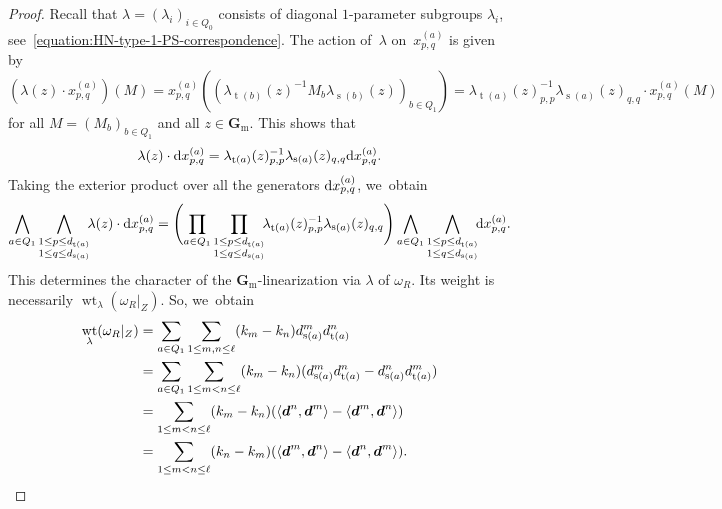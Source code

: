 \documentclass[11pt]{article}
\theoremstyle{plain}
\theoremstyle{definition}
\DeclareMathOperator\source{s}
\DeclareMathOperator\target{t}
\DeclareMathOperator\weight{wt}
\newcommand\diff{\mathrm{d} \kern 0pt}
\newcommand\Gm{\ensuremath{\mathbf{G}_{\mathrm{m}}}}
\newcommand\tuple[1]{\ensuremath{{\boldsymbol{#1}}}}
\begin{document}
\begin{proof}
Recall that $\lambda = (\lambda_i)_{i \in Q_0}$ consists of diagonal $1$-parameter subgroups $\lambda_i$,
see~\eqref{equation:HN-type-1-PS-correspondence}.
The action of~$\lambda$ on~$x_{p,q}^{(a)}$ is given by
\begin{equation*}
(\lambda(z) \cdot x_{p,q}^{(a)})(M) = x_{p,q}^{(a)}((\lambda_{\target(b)}(z)^{-1}M_b\lambda_{\source(b)}(z))_{b \in Q_1})
= \lambda_{\target(a)}(z)_{p,p}^{-1}\lambda_{\source(a)}(z)_{q,q}\cdot x_{p,q}^{(a)}(M)
\end{equation*}
for all $M = (M_b)_{b \in Q_1}$ and all $z \in \Gm$.
This shows that
\begin{equation*}
\lambda(z)\cdot \diff x_{p,q}^{(a)} = \lambda_{\target(a)}(z)_{p,p}^{-1}\lambda_{\source(a)}(z)_{q,q} \diff x_{p,q}^{(a)}.
\end{equation*}
Taking the exterior product over all the generators $\diff x_{p,q}^{(a)}$, we~obtain
\begin{equation*}
\bigwedge_{a \in Q_1}\bigwedge_{\substack{1 \leq p \leq d_{\target(a)} \\ 1 \leq q \leq d_{\source(a)}}} \!\! \lambda(z)\cdot \diff x_{p,q}^{(a)}
= \Biggl( \prod_{a \in Q_1} \prod_{\substack{1 \leq p \leq d_{\target(a)} \\ 1 \leq q \leq d_{\source(a)}}} \!\! \lambda_{\target(a)}(z)_{p,p}^{-1}\lambda_{\source(a)}(z)_{q,q} \Biggr) \bigwedge_{a \in Q_1} \bigwedge_{\substack{1 \leq p \leq d_{\target(a)} \\ 1 \leq q \leq d_{\source(a)}}} \!\!\diff x_{p,q}^{(a)}.
\end{equation*}
This determines the character of the $\Gm$-linearization via $\lambda$ of $\omega_R$.
Its weight is necessarily $\weight_\lambda(\omega_R|_Z)$. So, we~obtain
\begin{align*}
\weight_\lambda(\omega_R|_Z)
&= \sum_{a \in Q_1} \sum_{1 \leq m,n \leq \ell} (k_m - k_n) d_{\source(a)}^m d_{\target(a)}^n \\
&= \sum_{a \in Q_1} \sum_{1 \leq m < n \leq \ell}(k_m - k_n)(d_{\source(a)}^m d_{\target(a)}^n - d_{\source(a)}^n d_{\target(a)}^m) \\
&= \sum_{1 \leq m < n \leq \ell}(k_m - k_n)(\langle \tuple{d}^n,\tuple{d}^m \rangle - \langle \tuple{d}^m,\tuple{d}^n \rangle) \\
&= \sum_{1 \leq m < n \leq \ell}(k_n - k_m)(\langle \tuple{d}^m,\tuple{d}^n \rangle - \langle \tuple{d}^n,\tuple{d}^m \rangle).\qedhere
\end{align*}
\end{proof}
\end{document}
